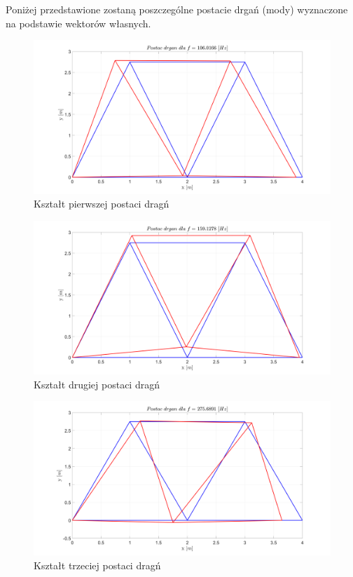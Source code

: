\documentclass[12pt, a4papper, twoside]{article}
\begin{document}
Poniżej przedstawione zostaną poszczególne postacie drgań (mody) wyznaczone na podstawie wektorów własnych.
\newpage


\begin{figure}[H]
    \centering
    \includegraphics[width=\textwidth, height=0.6\textwidth]{postac_dragn_1.png}
    \caption{Kształt pierwszej postaci dragń}
    \label{postac1}
\end{figure}

\begin{figure}[H]
    \centering
    \includegraphics[width=\textwidth, height=0.6\textwidth]{postac_dragn_2.png}
    \caption{Kształt drugiej postaci dragń}
    \label{postac2}
\end{figure}

\begin{figure}[H]
    \centering
    \includegraphics[width=\textwidth, height=0.6\textwidth]{postac_dragn_3.png}
    \caption{Kształt trzeciej postaci dragń}
    \label{postac3}
\end{figure}
\end{document}
